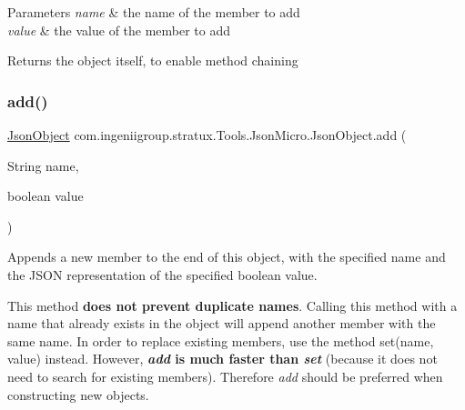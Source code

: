 \begin{DoxyParams}{Parameters}
{\em name} & the name of the member to add \\
\hline
{\em value} & the value of the member to add \\
\hline
\end{DoxyParams}
\begin{DoxyReturn}{Returns}
the object itself, to enable method chaining 
\end{DoxyReturn}
\mbox{\label{classcom_1_1ingeniigroup_1_1stratux_1_1_tools_1_1_json_micro_1_1_json_object_a75ea9593196267c8186bea6e0eea61e6}} 
\subsubsection{\texorpdfstring{add()}{add()}\hspace{0.1cm}{\footnotesize\ttfamily [5/7]}}
{\footnotesize\ttfamily \hyperlink{classcom_1_1ingeniigroup_1_1stratux_1_1_tools_1_1_json_micro_1_1_json_object}{Json\+Object} com.\+ingeniigroup.\+stratux.\+Tools.\+Json\+Micro.\+Json\+Object.\+add (\begin{DoxyParamCaption}\item[{String}]{name,  }\item[{boolean}]{value }\end{DoxyParamCaption})}

Appends a new member to the end of this object, with the specified name and the J\+S\+ON representation of the specified {\ttfamily boolean} value. 

This method {\bfseries does not prevent duplicate names}. Calling this method with a name that already exists in the object will append another member with the same name. In order to replace existing members, use the method {\ttfamily set(name, value)} instead. However, {\bfseries  {\itshape add} is much faster than {\itshape set}} (because it does not need to search for existing members). Therefore {\itshape add} should be preferred when constructing new objects. 


